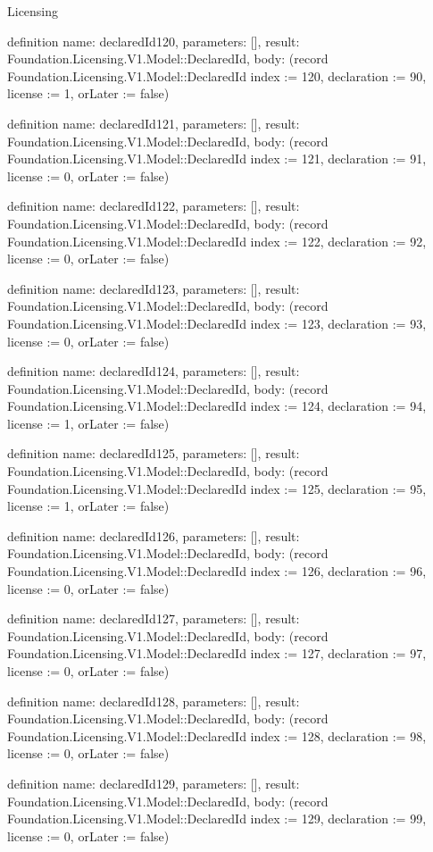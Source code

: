 \begin{lexlean}{Licensing}
\begin{semanticmodule}
definition{
  name: declaredId120,
  parameters: [],
  result: Foundation.Licensing.V1.Model::DeclaredId,
  body: (record Foundation.Licensing.V1.Model::DeclaredId {index := 120, declaration := 90, license := 1, orLater := false})
}

definition{
  name: declaredId121,
  parameters: [],
  result: Foundation.Licensing.V1.Model::DeclaredId,
  body: (record Foundation.Licensing.V1.Model::DeclaredId {index := 121, declaration := 91, license := 0, orLater := false})
}

definition{
  name: declaredId122,
  parameters: [],
  result: Foundation.Licensing.V1.Model::DeclaredId,
  body: (record Foundation.Licensing.V1.Model::DeclaredId {index := 122, declaration := 92, license := 0, orLater := false})
}

definition{
  name: declaredId123,
  parameters: [],
  result: Foundation.Licensing.V1.Model::DeclaredId,
  body: (record Foundation.Licensing.V1.Model::DeclaredId {index := 123, declaration := 93, license := 0, orLater := false})
}

definition{
  name: declaredId124,
  parameters: [],
  result: Foundation.Licensing.V1.Model::DeclaredId,
  body: (record Foundation.Licensing.V1.Model::DeclaredId {index := 124, declaration := 94, license := 1, orLater := false})
}

definition{
  name: declaredId125,
  parameters: [],
  result: Foundation.Licensing.V1.Model::DeclaredId,
  body: (record Foundation.Licensing.V1.Model::DeclaredId {index := 125, declaration := 95, license := 1, orLater := false})
}

definition{
  name: declaredId126,
  parameters: [],
  result: Foundation.Licensing.V1.Model::DeclaredId,
  body: (record Foundation.Licensing.V1.Model::DeclaredId {index := 126, declaration := 96, license := 0, orLater := false})
}

definition{
  name: declaredId127,
  parameters: [],
  result: Foundation.Licensing.V1.Model::DeclaredId,
  body: (record Foundation.Licensing.V1.Model::DeclaredId {index := 127, declaration := 97, license := 0, orLater := false})
}

definition{
  name: declaredId128,
  parameters: [],
  result: Foundation.Licensing.V1.Model::DeclaredId,
  body: (record Foundation.Licensing.V1.Model::DeclaredId {index := 128, declaration := 98, license := 0, orLater := false})
}

definition{
  name: declaredId129,
  parameters: [],
  result: Foundation.Licensing.V1.Model::DeclaredId,
  body: (record Foundation.Licensing.V1.Model::DeclaredId {index := 129, declaration := 99, license := 0, orLater := false})
}


\end{semanticmodule}
\end{lexlean}
